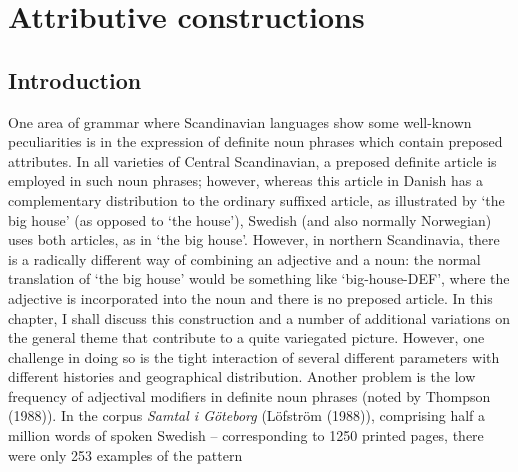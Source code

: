 \section[Attributive constructions]{\rmfamily Attributive constructions}
\subsection[Introduction]{\rmfamily Introduction}
\label{bkm:Ref262028996}%
One area of grammar where Scandinavian languages show some well-known peculiarities is in the expression of definite noun phrases which contain preposed attributes. In all varieties of Central Scandinavian, a preposed definite article is employed in such noun phrases; however, whereas this article in Danish has a complementary distribution to the ordinary suffixed article, as illustrated by  ‘the big house’ (as opposed to  ‘the house’), Swedish (and also normally Norwegian) uses both articles, as in  ‘the big house’. However, in northern Scandinavia, there is a radically different way of combining an adjective and a noun: the normal translation of ‘the big house’ would be something like  ‘big-house-DEF’, where the adjective is incorporated into the noun and there is no preposed article. In this chapter, I shall discuss this construction and a number of additional variations on the general theme that contribute to a quite variegated picture. However, one challenge in doing so is the tight interaction of several different parameters with different histories and geographical distribution. Another problem is the low frequency of adjectival modifiers in definite noun phrases (noted by Thompson (1988)). In the corpus \textit{Samtal i Göteborg }(Löfström (1988)), comprising half a million words of spoken Swedish – corresponding to 1250 printed pages, there were only 253 examples of the pattern

